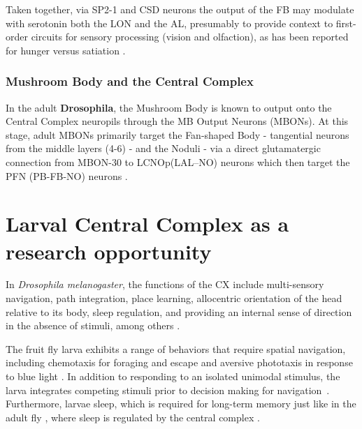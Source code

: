         Taken together, via SP2-1 and CSD neurons the output of the FB may modulate with serotonin both the LON and the AL, presumably to provide context to first-order circuits for sensory processing (vision and olfaction), as has been reported for hunger versus satiation \citep{vogt2021internalstate}.
        \subsubsection{Mushroom Body and the Central Complex}
        In the adult \textbf{Drosophila}, the Mushroom Body is known to output onto the Central Complex neuropils through the MB Output Neurons (MBONs). At this stage, adult MBONs primarily target the Fan-shaped Body - tangential neurons from the middle layers (4-6) - and the Noduli - via a direct glutamatergic connection from MBON-30 to LCNOp(LAL–NO) neurons which then target the PFN (PB-FB-NO) neurons \citep{hulse2021connectome}.


\section{Larval Central Complex as a research opportunity}
    In \textit{Drosophila melanogaster}, the functions of the CX include multi-sensory navigation, path integration, place learning, allocentric orientation of the head relative to its body, sleep regulation, and providing an internal sense of direction in the absence of stimuli, among others \citep{hanesch1989neuronal, ofstad2011visual, seelig2013feature, PfeifferHomberg2014, Stone2017CXModel, franconville2018building, heinze2018principles, szuperak2018sleep, pisokas2020head, ShaferKeene2021sleep, fisher2022flexible}.

    The fruit fly larva exhibits a range of behaviors that require spatial navigation, including chemotaxis for foraging and escape \citep{fishilevich2005chemotaxis, khurana2013olfactory, Ebrahim2015OR49, davies2015model} and aversive phototaxis in response to blue light \citep{sawin1995phototaxis, gong2009phototaxis, KeeneSprecher2012photobehavior}.
    In addition to responding to an isolated unimodal stimulus, the larva integrates competing stimuli prior to decision making for navigation~\citep{gepner2015computations}.
    Furthermore, larvae sleep, which is required for long-term memory \citep{poe2023sleepmemory} just like in the adult fly \citep{donlea2011sleep, donlea2019sleep}, where sleep is regulated by the central complex \citep{ShaferKeene2021sleep}.

